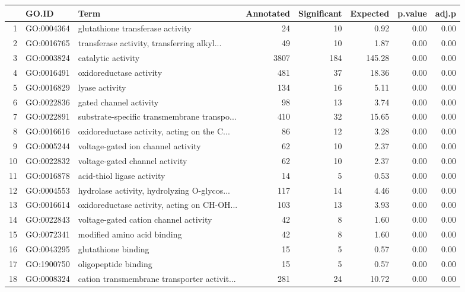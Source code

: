 \begin{table}[ht]
\centering
\begin{tabular}{rllrrrrr}
  \hline
 & GO.ID & Term & Annotated & Significant & Expected & p.value & adj.p \\ 
  \hline
1 & GO:0004364 & glutathione transferase activity &  24 &  10 & 0.92 & 0.00 & 0.00 \\ 
  2 & GO:0016765 & transferase activity, transferring alkyl... &  49 &  10 & 1.87 & 0.00 & 0.00 \\ 
  3 & GO:0003824 & catalytic activity & 3807 & 184 & 145.28 & 0.00 & 0.00 \\ 
  4 & GO:0016491 & oxidoreductase activity & 481 &  37 & 18.36 & 0.00 & 0.00 \\ 
  5 & GO:0016829 & lyase activity & 134 &  16 & 5.11 & 0.00 & 0.00 \\ 
  6 & GO:0022836 & gated channel activity &  98 &  13 & 3.74 & 0.00 & 0.00 \\ 
  7 & GO:0022891 & substrate-specific transmembrane transpo... & 410 &  32 & 15.65 & 0.00 & 0.00 \\ 
  8 & GO:0016616 & oxidoreductase activity, acting on the C... &  86 &  12 & 3.28 & 0.00 & 0.00 \\ 
  9 & GO:0005244 & voltage-gated ion channel activity &  62 &  10 & 2.37 & 0.00 & 0.00 \\ 
  10 & GO:0022832 & voltage-gated channel activity &  62 &  10 & 2.37 & 0.00 & 0.00 \\ 
  11 & GO:0016878 & acid-thiol ligase activity &  14 &   5 & 0.53 & 0.00 & 0.00 \\ 
  12 & GO:0004553 & hydrolase activity, hydrolyzing O-glycos... & 117 &  14 & 4.46 & 0.00 & 0.00 \\ 
  13 & GO:0016614 & oxidoreductase activity, acting on CH-OH... & 103 &  13 & 3.93 & 0.00 & 0.00 \\ 
  14 & GO:0022843 & voltage-gated cation channel activity &  42 &   8 & 1.60 & 0.00 & 0.00 \\ 
  15 & GO:0072341 & modified amino acid binding &  42 &   8 & 1.60 & 0.00 & 0.00 \\ 
  16 & GO:0043295 & glutathione binding &  15 &   5 & 0.57 & 0.00 & 0.00 \\ 
  17 & GO:1900750 & oligopeptide binding &  15 &   5 & 0.57 & 0.00 & 0.00 \\ 
  18 & GO:0008324 & cation transmembrane transporter activit... & 281 &  24 & 10.72 & 0.00 & 0.00 \\ 

\end{tabular}
\end{table}

